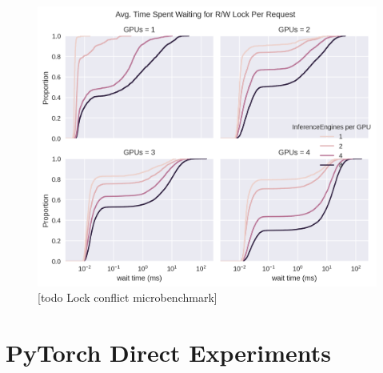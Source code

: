 \begin{figure}[h!]
    \centering
    \includegraphics[width=\textwidth]{figures/Lock_Conflicts.png}
    
    \caption{[todo Lock conflict microbenchmark]}
    \label{Eval: Lock conflict microbenchmark}
\end{figure}    






\section{PyTorch Direct Experiments}
